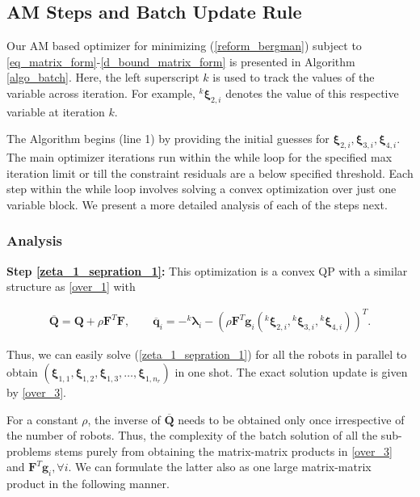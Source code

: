 \subsection{AM Steps and Batch Update Rule}
\noindent Our AM based optimizer for minimizing (\ref{reform_bergman}) subject to \eqref{eq_matrix_form}-\eqref{d_bound_matrix_form} is presented in Algorithm \ref{algo_batch}. Here, the left superscript $k$ is used to track the values of the variable across iteration. For example, ${^k}\boldsymbol{\xi}_{2, i}$ denotes the value of this respective variable at iteration $k$.

The Algorithm begins (line 1) by providing the initial guesses for $\boldsymbol{\xi}_{2, i}, \boldsymbol{\xi}_{3, i}, \boldsymbol{\xi}_{4, i}$. The main optimizer iterations run within the while loop for the specified max iteration limit or till the constraint residuals are a below specified threshold. Each step within the while loop involves solving a convex optimization over just one variable block. We present a more detailed analysis of each of the steps next.

\subsubsection{Analysis}

\noindent \textbf{Step \eqref{zeta_1_sepration_1}:} This optimization is a convex QP
with a similar structure as \eqref{over_1} with 

\begin{align}
\overline{\textbf{Q}}= \textbf{Q} + \rho \textbf{F}^{T}\textbf{F},\qquad
\overline{\textbf{q}}_{i} =  -{^k}\boldsymbol{\lambda}_{i} 
-( \rho\textbf{F}^{T}\textbf{g}_{i}({^k}\boldsymbol{\xi}_{2,i},{^k}\boldsymbol{\xi}_{3,i}, {^k}\boldsymbol{\xi}_{4,i}))^{T}
\label{zeta_1_sepration_3}.
 \end{align}

\noindent Thus, we can easily solve (\ref{zeta_1_sepration_1}) for all the robots in parallel to obtain $(\boldsymbol{\xi}_{1, 1}, \boldsymbol{\xi}_{1, 2}, \boldsymbol{\xi}_{1, 3} , \dots, \boldsymbol{\xi}_{1, n_{r}} ) $ in one shot. The exact solution update is given by \eqref{over_3}.

\noindent For a constant $\rho$, the inverse of $\overline{\textbf{Q}}$ needs to be obtained only once irrespective of the number of robots. Thus, the complexity of the batch solution of all the sub-problems stems purely from obtaining the matrix-matrix products in  \eqref{over_3} and  $\textbf{F}^T\textbf{g}_i, \forall i$. We can formulate the latter also as one large matrix-matrix product in the following manner.

